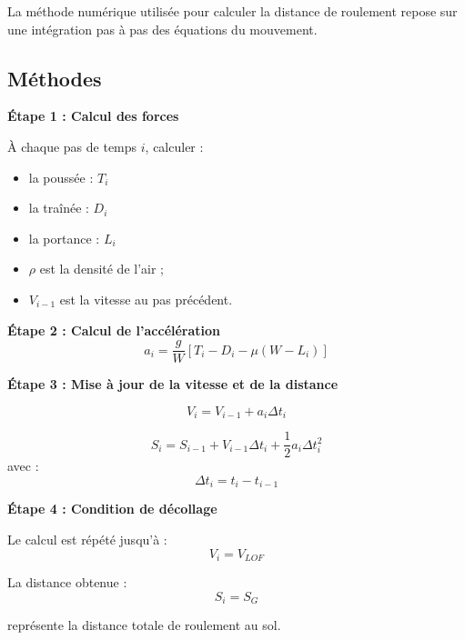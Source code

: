 			La méthode numérique utilisée pour calculer la distance de roulement repose sur une intégration pas à pas des équations du mouvement.
			
			\subsection{Méthodes}
			\textbf{Étape 1 : Calcul des forces} 
			
				À chaque pas de temps $i$, calculer :
				
				\begin{itemize}
					\item la poussée : $T_i$
					\item la traînée : $D_i$
					\item la portance : $L_i$
					\item $\rho$ est la densité de l’air ;
					\item $V_{i-1}$ est la vitesse au pas précédent.
				\end{itemize}
				
			\textbf{Étape 2 : Calcul de l’accélération}
				\[ a_i= \frac{g}{W}	\left[	T_i-D_i-\mu(W-L_i)	\right]	\] 		
				
				
			\textbf{Étape 3 : Mise à jour de la vitesse et de la distance}
			
				\[	V_i=V_{i-1}+a_i\Delta t_i	\]
				
				\[	S_i=S_{i-1}	+ V_{i-1}\Delta t_i + \frac{1}{2}a_i\Delta t_i^2 \]		avec :	\[	\Delta t_i=t_i-t_{i-1}	\]
				
			\textbf{Étape 4 : Condition de décollage}
			
			Le calcul est répété jusqu’à :	\[	V_i=V_{LOF}	\]
			
			La distance obtenue :		\[	S_i=S_G	\]
			
			représente la distance totale de roulement au sol.
			
	
			
			
			
			
			
		
		
		
		
		
		
